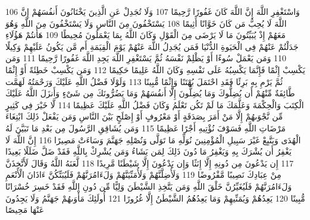 \documentclass[20pt,a4paper]{article}
\begin{document}
{\tiny\colorbox{cl_aya}{106}} وَاسْتَغْفِرِ اللَّهَ إِنَّ اللَّهَ كَانَ غَفُورًا رَّحِيمًا
{\tiny\colorbox{cl_aya}{107}} وَلَا تُجَدِلْ عَنِ الَّذِينَ يَخْتَانُونَ أَنفُسَهُمْ إِنَّ اللَّهَ لَا يُحِبُّ مَن كَانَ خَوَّانًا أَثِيمًا
{\tiny\colorbox{cl_aya}{108}} يَسْتَخْفُونَ مِنَ النَّاسِ وَلَا يَسْتَخْفُونَ مِنَ اللَّهِ وَهُوَ مَعَهُمْ إِذْ يُبَيِّتُونَ مَا لَا يَرْضَى مِنَ الْقَوْلِ وَكَانَ اللَّهُ بِمَا يَعْمَلُونَ مُحِيطًا
{\tiny\colorbox{cl_aya}{109}} هَأَنتُمْ هَؤُلَاءِ جَدَلْتُمْ عَنْهُمْ فِى الْحَيَوةِ الدُّنْيَا فَمَن يُجَدِلُ اللَّهَ عَنْهُمْ يَوْمَ الْقِيَمَةِ أَم مَّن يَكُونُ عَلَيْهِمْ وَكِيلًا
{\tiny\colorbox{cl_aya}{110}} وَمَن يَعْمَلْ سُوءًا أَوْ يَظْلِمْ نَفْسَهُ ثُمَّ يَسْتَغْفِرِ اللَّهَ يَجِدِ اللَّهَ غَفُورًا رَّحِيمًا
{\tiny\colorbox{cl_aya}{111}} وَمَن يَكْسِبْ إِثْمًا فَإِنَّمَا يَكْسِبُهُ عَلَى نَفْسِهِ وَكَانَ اللَّهُ عَلِيمًا حَكِيمًا
{\tiny\colorbox{cl_aya}{112}} وَمَن يَكْسِبْ خَطِئَةً أَوْ إِثْمًا ثُمَّ يَرْمِ بِهِ بَرِئًا فَقَدِ احْتَمَلَ بُهْتَنًا وَإِثْمًا مُّبِينًا
{\tiny\colorbox{cl_aya}{113}} وَلَوْلَا فَضْلُ اللَّهِ عَلَيْكَ وَرَحْمَتُهُ لَهَمَّت طَّائِفَةٌ مِّنْهُمْ أَن يُضِلُّوكَ وَمَا يُضِلُّونَ إِلَّا أَنفُسَهُمْ وَمَا يَضُرُّونَكَ مِن شَىْءٍ وَأَنزَلَ اللَّهُ عَلَيْكَ الْكِتَبَ وَالْحِكْمَةَ وَعَلَّمَكَ مَا لَمْ تَكُن تَعْلَمُ وَكَانَ فَضْلُ اللَّهِ عَلَيْكَ عَظِيمًا
{\tiny\colorbox{cl_aya}{114}} لَّا خَيْرَ فِى كَثِيرٍ مِّن نَّجْوَىهُمْ إِلَّا مَنْ أَمَرَ بِصَدَقَةٍ أَوْ مَعْرُوفٍ أَوْ إِصْلَحٍ بَيْنَ النَّاسِ وَمَن يَفْعَلْ ذَلِكَ ابْتِغَاءَ مَرْضَاتِ اللَّهِ فَسَوْفَ نُؤْتِيهِ أَجْرًا عَظِيمًا
{\tiny\colorbox{cl_aya}{115}} وَمَن يُشَاقِقِ الرَّسُولَ مِن بَعْدِ مَا تَبَيَّنَ لَهُ الْهُدَى وَيَتَّبِعْ غَيْرَ سَبِيلِ الْمُؤْمِنِينَ نُوَلِّهِ مَا تَوَلَّى وَنُصْلِهِ جَهَنَّمَ وَسَاءَتْ مَصِيرًا
{\tiny\colorbox{cl_aya}{116}} إِنَّ اللَّهَ لَا يَغْفِرُ أَن يُشْرَكَ بِهِ وَيَغْفِرُ مَا دُونَ ذَلِكَ لِمَن يَشَاءُ وَمَن يُشْرِكْ بِاللَّهِ فَقَدْ ضَلَّ ضَلَلًا بَعِيدًا
{\tiny\colorbox{cl_aya}{117}} إِن يَدْعُونَ مِن دُونِهِ إِلَّا إِنَثًا وَإِن يَدْعُونَ إِلَّا شَيْطَنًا مَّرِيدًا
{\tiny\colorbox{cl_aya}{118}} لَّعَنَهُ اللَّهُ وَقَالَ لَأَتَّخِذَنَّ مِنْ عِبَادِكَ نَصِيبًا مَّفْرُوضًا
{\tiny\colorbox{cl_aya}{119}} وَلَأُضِلَّنَّهُمْ وَلَأُمَنِّيَنَّهُمْ وَلَءَامُرَنَّهُمْ فَلَيُبَتِّكُنَّ ءَاذَانَ الْأَنْعَمِ وَلَءَامُرَنَّهُمْ فَلَيُغَيِّرُنَّ خَلْقَ اللَّهِ وَمَن يَتَّخِذِ الشَّيْطَنَ وَلِيًّا مِّن دُونِ اللَّهِ فَقَدْ خَسِرَ خُسْرَانًا مُّبِينًا
{\tiny\colorbox{cl_aya}{120}} يَعِدُهُمْ وَيُمَنِّيهِمْ وَمَا يَعِدُهُمُ الشَّيْطَنُ إِلَّا غُرُورًا
{\tiny\colorbox{cl_aya}{121}} أُولَئِكَ مَأْوَىهُمْ جَهَنَّمُ وَلَا يَجِدُونَ عَنْهَا مَحِيصًا
\end{document}
